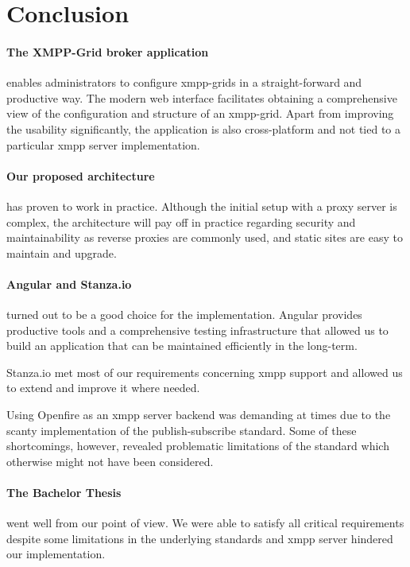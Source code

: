 \section{Conclusion}
\paragraph{The XMPP-Grid broker application} enables administrators to configure \glspl{xmpp-grid} in a straight-forward and productive way.
The modern web interface facilitates obtaining a comprehensive view of the configuration and structure of an \gls{xmpp-grid}.
Apart from improving the usability significantly, the application is also cross-platform and not tied to a particular \gls{xmpp} server implementation.

\paragraph{Our proposed architecture} has proven to work in practice.
Although the initial setup with a proxy server is complex, the architecture will pay off in practice regarding security and maintainability as reverse proxies are commonly used, and static sites are easy to maintain and upgrade.

\paragraph{Angular and Stanza.io} turned out to be a good choice for the implementation.
Angular provides productive tools and a comprehensive testing infrastructure that allowed us to build an application that can be maintained efficiently in the long-term.

Stanza.io met most of our requirements concerning \gls{xmpp} support and allowed us to extend and improve it where needed.

Using Openfire as an \gls{xmpp} server backend was demanding at times due to the scanty implementation of the \gls{publish-subscribe} standard.
Some of these shortcomings, however, revealed problematic limitations of the standard which otherwise might not have been considered.

\paragraph{The Bachelor Thesis} went well from our point of view.
We were able to satisfy all critical requirements despite some limitations in the underlying standards and \gls{xmpp} server hindered our implementation.

